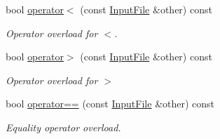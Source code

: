 \begin{DoxyCompactItemize}
bool \hyperlink{class_input_file_a8c7c438538b8b183454632c27a55f701}{operator$<$} (const \hyperlink{class_input_file}{Input\+File} \&other) const
\begin{DoxyCompactList}\small\item\em Operator overload for $<$. \end{DoxyCompactList}\item 
bool \hyperlink{class_input_file_a4bf7efae68f3f378d1d4d1565fce8081}{operator$>$} (const \hyperlink{class_input_file}{Input\+File} \&other) const
\begin{DoxyCompactList}\small\item\em Operator overload for $>$ \end{DoxyCompactList}\item 
bool \hyperlink{class_input_file_aba80d895922ad25de1bdd7724d35755a}{operator==} (const \hyperlink{class_input_file}{Input\+File} \&other) const
\begin{DoxyCompactList}\small\item\em Equality operator overload. \end{DoxyCompactList}\end{DoxyCompactItemize}
